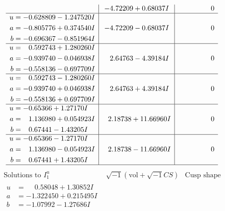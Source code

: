 \documentclass[1p]{elsarticle_modified}
\theoremstyle{definition}
\newcommand{\I}{\sqrt{-1}}
\begin{document}
$$\begin{array}{c|c|c}
 & -4.72209 + 0.68037 I & \phantom{-0.000000 } 0 \\ \hline\begin{aligned}
u &= -0.628809 - 1.247520 I \\
a &= -0.805776 + 0.374540 I \\
b &= -0.696367 - 0.851964 I\end{aligned}
 & -4.72209 - 0.68037 I & \phantom{-0.000000 } 0 \\ \hline\begin{aligned}
u &= \phantom{-}0.592743 + 1.280260 I \\
a &= -0.939740 - 0.046938 I \\
b &= -0.558136 - 0.697709 I\end{aligned}
 & \phantom{-}2.64763 - 4.39184 I & \phantom{-0.000000 } 0 \\ \hline\begin{aligned}
u &= \phantom{-}0.592743 - 1.280260 I \\
a &= -0.939740 + 0.046938 I \\
b &= -0.558136 + 0.697709 I\end{aligned}
 & \phantom{-}2.64763 + 4.39184 I & \phantom{-0.000000 } 0 \\ \hline\begin{aligned}
u &= -0.65366 + 1.27170 I \\
a &= \phantom{-}1.136980 + 0.054923 I \\
b &= \phantom{-}0.67441 - 1.43205 I\end{aligned}
 & \phantom{-}2.18738 + 11.66960 I & \phantom{-0.000000 } 0 \\ \hline\begin{aligned}
u &= -0.65366 - 1.27170 I \\
a &= \phantom{-}1.136980 - 0.054923 I \\
b &= \phantom{-}0.67441 + 1.43205 I\end{aligned}
 & \phantom{-}2.18738 - 11.66960 I & \phantom{-0.000000 } 0\\
 \hline 
 \end{array}$$\newpage$$\begin{array}{c|c|c}  
\text{Solutions to }I^u_{1}& \I (\text{vol} + \sqrt{-1}CS) & \text{Cusp shape}\\
 \hline 
\begin{aligned}
u &= \phantom{-}0.58048 + 1.30852 I \\
a &= -1.322450 + 0.215495 I \\
b &= -1.07992 - 1.27686 I\end{aligned}

\end{array}$$
\end{document}
